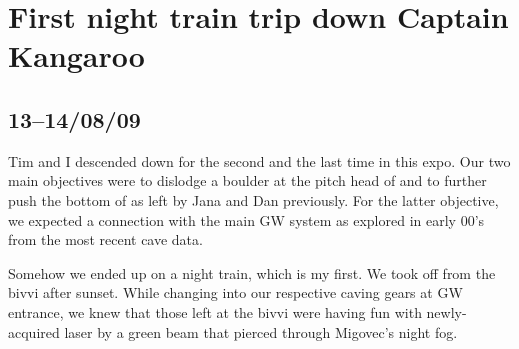 \section{First night train trip down Captain Kangaroo}

\subsection{13--14/08/09}


Tim and I descended down  for the second and the
last time in this expo. Our two main objectives were to dislodge a
boulder at the pitch head of  and to further push the
bottom of  as left by Jana and Dan previously. For
the latter objective, we expected a connection with the main GW system
as explored in early 00's from the most recent cave data.

Somehow we ended up on a night train, which is my first. We took off
from the bivvi after sunset. While changing into our respective caving
gears at GW entrance, we knew that those left at the bivvi were having
fun with newly-acquired laser by a green beam that pierced through
Migovec's night fog.

